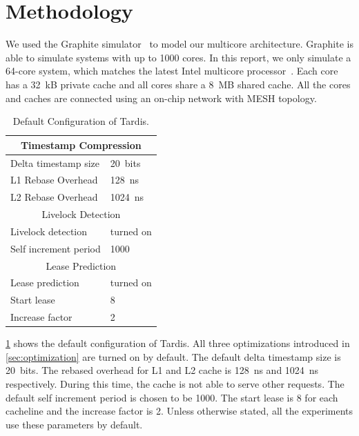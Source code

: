 \documentclass[12pt]{article}
\begin{document}
	\section{Methodology}
	
	We used the Graphite simulator~\cite{graphite} to model our multicore 
	architecture. Graphite is able to simulate 
	systems with up to 1000 cores. In this report, we only simulate a 
	64-core system, which matches the latest Intel multicore 
	processor~\cite{xeonphi}. Each core has a 32~kB private cache and all 
	cores share a 8~MB shared cache. All the cores and caches are 
	connected using an on-chip network with MESH topology.
	
	\begin{table}
		\caption{ Default Configuration of Tardis. }
		\begin{center}
			{ 
				\begin{tabular}{|l|l|}
					\hline
					\multicolumn{2}{|c|}{Timestamp Compression} \\
					\hline
					Delta timestamp size 		& 20~bits \\
					L1 Rebase Overhead 			& 128~ns\\
					L2 Rebase Overhead			& 1024~ns \\
					\hline
					\multicolumn{2}{|c|}{Livelock Detection} \\
					\hline
					Livelock detection 			& turned on \\
					Self increment period 		& 1000 \\
					\hline
					\multicolumn{2}{|c|}{Lease Prediction} \\
					\hline
					Lease prediction			& turned on \\
					Start lease 				& 8 \\
					Increase factor				& 2 \\
					\hline
				\end{tabular}
			}
		\end{center}
		\label{tab:system}
		\vspace{-.2in}
	\end{table}
	
	\cref{tab:system} shows the default configuration of Tardis. All 
	three optimizations introduced in \cref{sec:optimization} are turned 
	on by default. The default delta timestamp size is 20~bits. The
	rebased overhead for L1 and L2 cache is 128~ns and 1024~ns 
	respectively. During this time, the cache is not able to serve other 
	requests. The default self increment period is chosen to be 1000. The 
	start lease is 8 for each cacheline and the increase factor is 2. 
	Unless otherwise stated, all the experiments use these parameters by 
	default.
	
\end{document}
